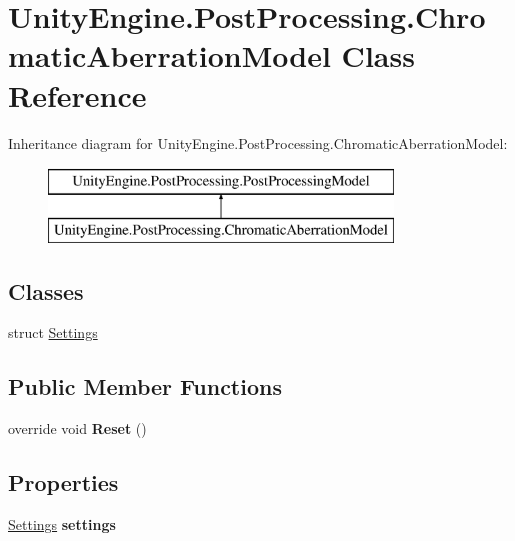 \hypertarget{class_unity_engine_1_1_post_processing_1_1_chromatic_aberration_model}{}\section{Unity\+Engine.\+Post\+Processing.\+Chromatic\+Aberration\+Model Class Reference}
\label{class_unity_engine_1_1_post_processing_1_1_chromatic_aberration_model}
Inheritance diagram for Unity\+Engine.\+Post\+Processing.\+Chromatic\+Aberration\+Model\+:\begin{figure}[H]
\begin{center}
\leavevmode
\includegraphics[height=2.000000cm]{class_unity_engine_1_1_post_processing_1_1_chromatic_aberration_model}
\end{center}
\end{figure}
\subsection*{Classes}
\begin{DoxyCompactItemize}
\item 
struct \hyperlink{struct_unity_engine_1_1_post_processing_1_1_chromatic_aberration_model_1_1_settings}{Settings}
\end{DoxyCompactItemize}
\subsection*{Public Member Functions}
\begin{DoxyCompactItemize}
\item 
\mbox{\label{class_unity_engine_1_1_post_processing_1_1_chromatic_aberration_model_a10912d80b3a86b38f88a0bfee52ff948}} 
override void {\bfseries Reset} ()
\end{DoxyCompactItemize}
\subsection*{Properties}
\begin{DoxyCompactItemize}
\item 
\mbox{\label{class_unity_engine_1_1_post_processing_1_1_chromatic_aberration_model_ae3d8ac283bcf4f8c8d115b0f026d0da2}} 
\hyperlink{struct_unity_engine_1_1_post_processing_1_1_chromatic_aberration_model_1_1_settings}{Settings} {\bfseries settings}
\end{DoxyCompactItemize}
